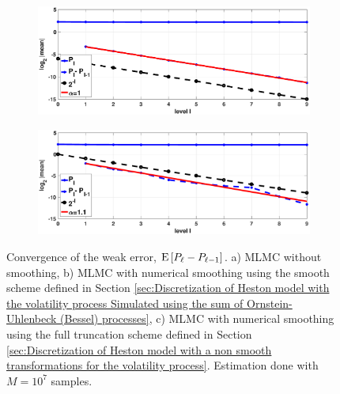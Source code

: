 \begin{figure}[htb]
	\centering 
	\begin{subfigure}{0.5\textwidth}
		\includegraphics[width=\linewidth]{./figures/MLMC_binary_GBM_opt/without_smoothing/digital_option_set1_L_0_2_steps_L_9_N_10_7_weak}
		\caption{}
		\label{fig:weak_rate_GBM_digital_non_smoothing}
	\end{subfigure}\hfil %
	\begin{subfigure}{0.5\textwidth}
		\includegraphics[width=\linewidth]{./figures/MLMC_binary_GBM_opt/with_smoothing/digital_option_set1_L_0_2_steps_L_9_N_10_5_weak}
		\caption{}
		\label{fig:weak_rate_GBM_digital_smoothing}
	\end{subfigure}\hfil 
	\caption{Convergence of the weak error,  $\mathrm{E}\left[P_{\ell}-P_{\ell-1}\right]$. a) MLMC without smoothing, b) MLMC with numerical smoothing using the smooth scheme defined in Section \ref{sec:Discretization of Heston model with the volatility process Simulated using the sum of  Ornstein-Uhlenbeck (Bessel) processes}, c) MLMC with numerical smoothing using the full truncation scheme defined in Section \ref{sec:Discretization of Heston model with a non smooth transformations for the volatility process}. Estimation done with $M=10^7$ samples.}
	\label{fig:weak_rate_GBM_digital}	
\end{figure}
\FloatBarrier

